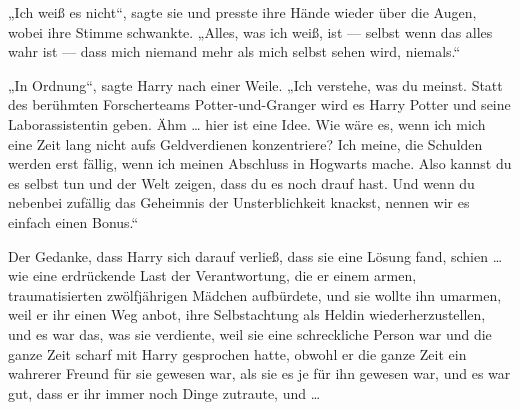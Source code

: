 „Ich weiß es nicht“, sagte sie und presste ihre Hände wieder über die Augen, wobei ihre Stimme schwankte.
„Alles, was ich weiß, ist — selbst wenn das alles wahr ist — dass mich niemand mehr als mich selbst sehen wird, niemals.“

„In Ordnung“, sagte Harry nach einer Weile.
„Ich verstehe, was du meinst. Statt des berühmten Forscherteams Potter-und-Granger wird es Harry Potter und seine Laborassistentin geben. Ähm … hier ist eine Idee. Wie wäre es, wenn ich mich eine Zeit lang nicht aufs Geldverdienen konzentriere? Ich meine, die Schulden werden erst fällig, wenn ich meinen Abschluss in Hogwarts mache. Also kannst du es selbst tun und der Welt zeigen, dass du es noch drauf hast. Und wenn du nebenbei zufällig das Geheimnis der Unsterblichkeit knackst, nennen wir es einfach einen Bonus.“

Der Gedanke, dass Harry sich darauf verließ, dass sie eine Lösung fand, schien … wie eine erdrückende Last der Verantwortung, die er einem armen, traumatisierten zwölfjährigen Mädchen aufbürdete, und sie wollte ihn umarmen, weil er ihr einen Weg anbot, ihre Selbstachtung als Heldin wiederherzustellen, und es war das, was sie verdiente, weil sie eine schreckliche Person war und die ganze Zeit scharf mit Harry gesprochen hatte, obwohl er die ganze Zeit ein wahrerer Freund für sie gewesen war, als sie es je für ihn gewesen war, und es war gut, dass er ihr immer noch Dinge zutraute, und …

